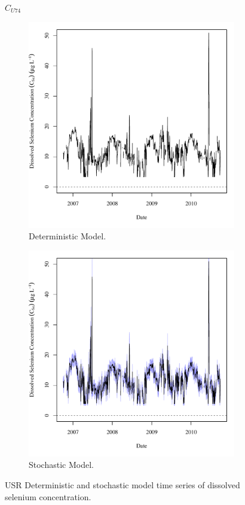 \subfiguremid
\begin{landscape}
	\begin{figure}
		$ C_{U74} $
		\begin{subfigure}{0.7\textwidth}
			\centering
			\includegraphics[width=\tableCustomSize]{"Figures/Results_USR/Deterministic/c TS CAN"}
			\caption{Deterministic Model.}
		\end{subfigure}%
		\begin{subfigure}{0.7\textwidth}
			\centering
			\includegraphics[width=\tableCustomSize]{"Figures/Results_USR/Stochastic/c TS CAN"}
			\caption{Stochastic Model.}
		\end{subfigure}
		\caption{USR Deterministic and stochastic model time series of dissolved selenium concentration.}
	\end{figure}
\end{landscape}


